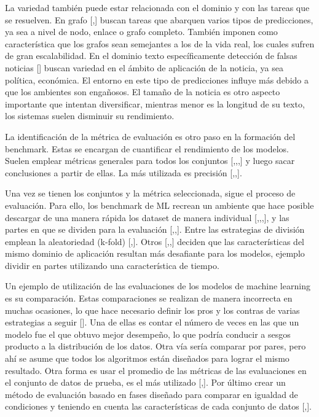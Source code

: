 La variedad también puede estar relacionada con el dominio y con las tareas que se resuelven. En grafo [\cite{5},\cite{6}] buscan tareas que abarquen varios 
tipos de predicciones, ya sea a nivel de nodo, enlace o grafo completo. También imponen como característica que los grafos sean semejantes a los de la vida real, 
los cuales sufren de gran escalabilidad. En el dominio texto específicamente detección de falsas noticias [\cite{4}] buscan variedad en el ámbito de aplicación de la 
noticia, ya sea política, económica. El entorno en este tipo de predicciones influye más debido a que los ambientes son engañosos. El tamaño de la 
noticia es otro aspecto importante que intentan diversificar, mientras menor es la longitud de su texto, los sistemas suelen disminuir su rendimiento.

La identificación de la métrica de evaluación es otro paso en la formación del benchmark. Estas se encargan de cuantificar el rendimiento de los modelos. Suelen 
emplear métricas generales para todos los conjuntos [\cite{3},\cite{7},\cite{5},\cite{6}] y luego sacar conclusiones a partir de ellas. La más utilizada es precisión 
[\cite{4},\cite{1},\cite{2}].

Una vez se tienen los conjuntos y la métrica seleccionada, sigue el proceso de evaluación. Para ello, los benchmark de ML recrean un ambiente que hace posible 
descargar de una manera rápida los dataset de manera individual [\cite{2},\cite{3},\cite{5},\cite{6}], y las partes en que se dividen para la evaluación 
[\cite{3},\cite{4},\cite{7}]. Entre las estrategias de división emplean la aleatoriedad (k-fold) [\cite{1},\cite{2}]. Otros [\cite{4},\cite{5},\cite{6}] deciden que 
las características del mismo dominio de aplicación resultan más desafiante para los modelos, ejemplo dividir en partes utilizando una característica de tiempo.

Un ejemplo de utilización de las evaluaciones de los modelos de machine learning es su comparación. Estas comparaciones se realizan de manera incorrecta en muchas 
ocasiones, lo que hace necesario definir los pros y los contras de varias estrategias a seguir [\cite{1}]. Una de ellas es contar el número de veces en las que un 
modelo fue el que obtuvo mejor desempeño, lo que podría conducir a sesgos producto a la distribución de los datos. Otra vía sería comparar por pares, pero ahí se 
asume que todos los algoritmos están diseñados para lograr el mismo resultado. Otra forma es usar el promedio de las métricas de las evaluaciones en el conjunto de 
datos de prueba, es el más utilizado [\cite{3},\cite{2}]. Por último crear un método de evaluación basado en fases diseñado para comparar en igualdad de condiciones 
y teniendo en cuenta las características de cada conjunto de datos [\cite{1},\cite{7}].  

